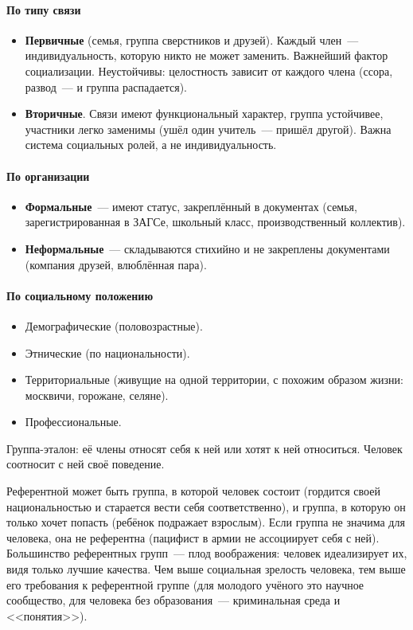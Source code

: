 \documentclass[12pt]{article}
\begin{document}
	\paragraph{По типу связи}
	\begin{itemize}
		\item \textbf{Первичные} (семья, группа сверстников и друзей). Каждый член~--- индивидуальность, которую никто не может заменить. Важнейший фактор социализации. Неустойчивы: целостность зависит от каждого члена (ссора, развод~--- и группа распадается).
		\item \textbf{Вторичные}. Связи имеют функциональный характер, группа устойчивее, участники легко заменимы (ушёл один учитель~--- пришёл другой). Важна система социальных ролей, а не индивидуальность.
	\end{itemize}

	\paragraph{По организации}
	\begin{itemize}
		\item \textbf{Формальные}~--- имеют статус, закреплённый в документах (семья, зарегистрированная в ЗАГСе, школьный класс, производственный коллектив).
		\item \textbf{Неформальные}~--- складываются стихийно и не закреплены документами (компания друзей, влюблённая пара).
	\end{itemize}

	\paragraph{По социальному положению}
	\begin{itemize}
		\item Демографические (половозрастные).
		\item Этнические (по национальности).
		\item Территориальные (живущие на одной территории, с похожим образом жизни: москвичи, горожане, селяне).
		\item Профессиональные.
	\end{itemize}

	\begin{definition}
		Группа-эталон: её члены относят себя к ней или хотят к ней относиться. Человек соотносит с ней своё поведение.
	\end{definition}

	\begin{note}
		Референтной может быть группа, в которой человек состоит (гордится своей национальностью и старается вести себя соответственно), и группа, в которую он только хочет попасть (ребёнок подражает взрослым). Если группа не значима для человека, она не референтна (пацифист в армии не ассоциирует себя с ней). Большинство референтных групп~--- плод воображения: человек идеализирует их, видя только лучшие качества. Чем выше социальная зрелость человека, тем выше его требования к референтной группе (для молодого учёного это научное сообщество, для человека без образования~--- криминальная среда и <<понятия>>).
	\end{note}
\end{document}
